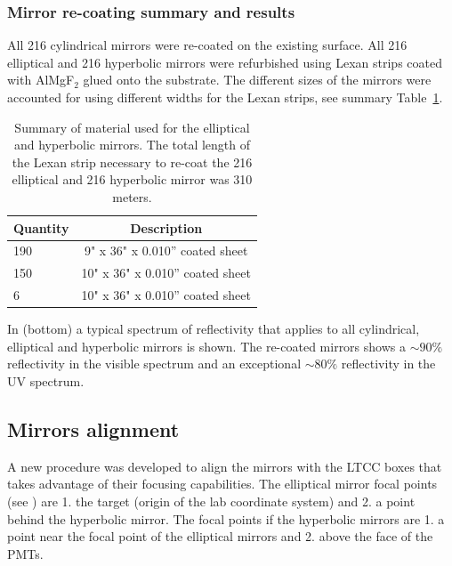 \subsubsection{Mirror re-coating summary and results}

All 216 cylindrical mirrors were re-coated on the existing surface. All 216 elliptical and 216 hyperbolic mirrors were refurbished using Lexan strips
coated with AlMgF$_2$ glued onto the substrate. The different sizes of the mirrors were accounted for using different widths for the Lexan strips, see
summary Table~\ref{tab:strips}.


\begin{table}
	\begin{center}
		\begin{tabular}{| l | c |}
			\hline \hline
			Quantity  & Description \\
			\hline
			190       & 9" x 36" x 0.010” coated sheet    \\
			150       & 10" x 36" x 0.010” coated sheet   \\
			6         & 10" x 36" x 0.010” coated sheet   \\
			\hline \hline
		\end{tabular}
	\end{center}
	\caption{Summary of material used for the elliptical and hyperbolic mirrors. The total length of the Lexan strip necessary to re-coat the 216 elliptical
            and 216 hyperbolic mirror was 310 meters.}\label{tab:strips}
\end{table}


In  (bottom) a typical spectrum of reflectivity that applies to all cylindrical, elliptical and hyperbolic mirrors is shown.
The re-coated mirrors shows a $\sim 90\%$ reflectivity in the visible spectrum and an exceptional $\sim 80\%$
reflectivity in the UV spectrum.



\subsection{Mirrors alignment}

A new procedure was developed to align the mirrors with the LTCC boxes that takes advantage of their focusing capabilities.
The elliptical mirror focal points (see ) are 1. the target (origin of the lab coordinate system)
and 2. a point behind the hyperbolic mirror. The focal points if the hyperbolic mirrors are 1. a point near the focal point of the elliptical mirrors and
2. above the face of the PMTs.

